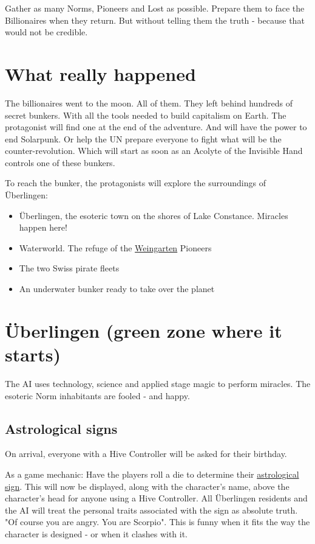 Gather as many Norms, Pioneers and Lost as possible. Prepare them to face the Billionaires when they return. But without telling them the truth - because that would not be credible.

\section{What really happened}

The billionaires went to the moon. All of them. They left behind hundreds of secret bunkers. With all the tools needed to build capitalism on Earth. The protagonist will find one at the end of the adventure. And will have the power to end Solarpunk.
Or help the UN prepare everyone to fight what will be the counter-revolution. Which will start as soon as an Acolyte of the Invisible Hand controls one of these bunkers.

To reach the bunker, the protagonists will explore the surroundings of Überlingen:
\begin{itemize}
    \item {Überlingen, the esoteric town on the shores of Lake Constance. Miracles happen here!}
    \item {Waterworld. The refuge of the \hyperref[subsec:Weingarten]{Weingarten} Pioneers}
    \item {The two Swiss pirate fleets}
    \item {An underwater bunker ready to take over the planet}
\end{itemize}


\section{Überlingen (green zone where it starts)}

The AI uses technology, science and applied stage magic to perform miracles. The esoteric Norm inhabitants are fooled - and happy.

\subsection{Astrological signs}

On arrival, everyone with a Hive Controller will be asked for their birthday.

As a game mechanic: Have the players roll a die to determine their \href{https://en.wikipedia.org/wiki/Astrological_sign}{astrological sign}. This will now be displayed, along with the character's name, above the character's head for anyone using a Hive Controller.
All Überlingen residents and the AI will treat the personal traits associated with the sign as absolute truth. "Of course you are angry. You are Scorpio". This is funny when it fits the way the character is designed - or when it clashes with it.

